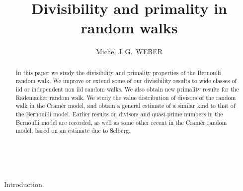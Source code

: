 \documentclass[11pt,draft,reqno]{amsart}
\makeatletter
\def\section{\@startsection{section}{1}%
     \z@{.7\linespacing\@plus\linespacing}{.5\linespacing}%
     {\bfseries%
     \centering
     }}
\theoremstyle{definition}
\theoremstyle{remarks}
\numberwithin{equation}{section}
\makeatother
\begin{document}

\vskip 1.5cm

 \scrollmode




  \newcommand{\sm}{\vskip} \newcommand{\ens}{\enspace} \


 \title[Divisibility and primality in   random walks]
  {Divisibility and primality in random walks}
 
   \author{ Michel J.\,G.\, WEBER}
  \address{IRMA, UMR 7501, Universit\'e
Louis-Pasteur et C.N.R.S.,   7  rue Ren\'e Descartes, 67084
Strasbourg Cedex, France.
  pt   E-mail:    {\tt  michel.weber@math.unistra.fr}}
 \begin{abstract}    In this paper we study the divisibility and primality properties of the Bernoulli random walk. We improve or extend some of our divisibility results  to wide classes of iid or independent non iid random walks. We also obtain new primality results       for  the Rademacher random walk. We study the value distribution of divisors of the random walk in the Cram\'er model, and obtain a general estimate of a similar kind to that of the Bernouilli model. 
   Earlier   results on  divisors and quasi-prime numbers in the Bernoulli model are recorded, as well as  some other recent    in the Cram\'er random model,  based on  an estimate due to Selberg.
\end{abstract}
\maketitle

\tableofcontents
\section{Introduction.}\label{s1}
\end{document}

